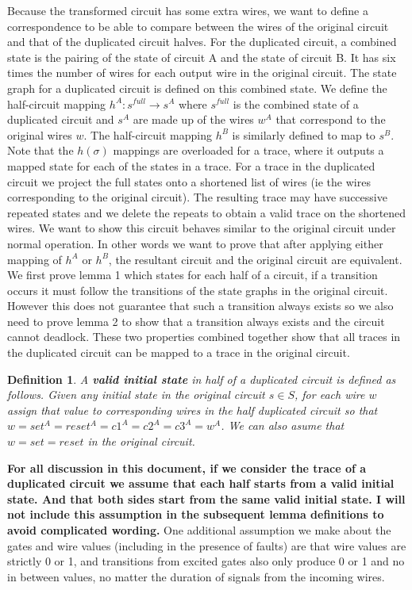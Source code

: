 \documentclass{article}
\newtheorem*{definition}{Definition}
\begin{document}
Because the transformed circuit has some extra wires, we want to define a correspondence to be able to compare between the wires of the original circuit and that of the duplicated circuit halves.  For the duplicated circuit, a combined state is the pairing of the state of circuit A and the state of circuit B. It has six times the number of wires for each output wire in the original circuit.  The state graph for a duplicated circuit is defined on this combined state.  We define the half-circuit mapping $h^A: s^{full} \to s^A$ where $s^{full}$ is the combined state of a duplicated circuit and $s^A$ are made up of the wires $w^A$ that correspond to the original wires $w$.  The half-circuit mapping $h^B$ is similarly defined to map to $s^B$.  Note that the $h(\sigma)$ mappings are overloaded for a trace, where it outputs a mapped state for each of the states in a trace.%
For a trace in the duplicated circuit we project the full states onto a shortened list of wires (ie the wires corresponding to the original circuit). The resulting trace may have successive repeated states and we delete the repeats to obtain a valid trace on the shortened wires.  %
\newline
We want to show this circuit behaves similar to the original circuit under normal operation.  In other words we want to prove that after applying either mapping of $h^A$ or $h^B$, the resultant circuit and the original circuit are equivalent.  We first prove lemma 1 which states for each half of a circuit, if a transition occurs it must follow the transitions of the state graphs in the original circuit.  However this does not guarantee that such a transition always exists so we also need to prove lemma 2 to show that a transition always exists and the circuit cannot deadlock.  These two properties combined together show that all traces in the duplicated circuit can be mapped to a trace in the original circuit.

\begin{definition} A \textbf{valid initial state} in half of a duplicated circuit is defined as follows.  Given any initial state in the original circuit $s \in S$, for each wire $w$ assign that value to corresponding wires in the half duplicated circuit so that $w=set^A=reset^A=c1^A=c2^A=c3^A=w^A$.  We can also asume that $w=set=reset$ in the original circuit.
\end{definition}
\textbf{
For all discussion in this document, if we consider the trace of a duplicated circuit we assume that each half starts from a valid initial state.  And that both sides start from the same valid initial state.  I will not include this assumption in the subsequent lemma definitions to avoid complicated wording.  }
One additional assumption we make about the gates and wire values (including in the presence of faults) are that wire values are strictly 0 or 1, and transitions from excited gates also only produce 0 or 1 and no in between values, no matter the duration of signals from the incoming wires.
\end{document}
